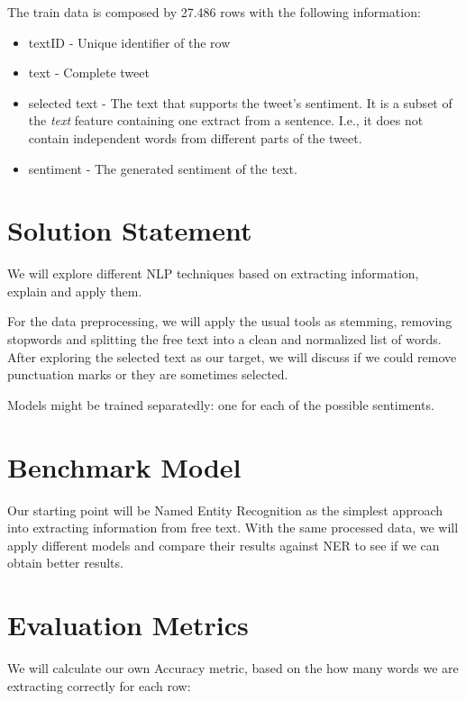 \documentclass[11pt]{article}
\begin{document}
The train data is composed by 27.486 rows with the following information:
\begin{itemize}
    \item textID - Unique identifier of the row
    \item text - Complete tweet
    \item selected text - The text that supports the tweet's sentiment. It is a subset of the \textit{text} feature containing one extract from a sentence. I.e., it does not contain independent words from different parts of the tweet.
    \item sentiment - The generated sentiment of the text.
\end{itemize}

\section{Solution Statement}

We will explore different NLP techniques based on extracting information, explain and apply them.

For the data preprocessing, we will apply the usual tools as stemming, removing stopwords and splitting the free text into a clean and normalized list of words. After exploring the selected text as our target, we will discuss if we could remove punctuation marks or they are sometimes selected.

Models might be trained separatedly: one for each of the possible sentiments.

\section{Benchmark Model}

Our starting point will be Named Entity Recognition as the simplest approach into extracting information from free text.
With the same processed data, we will apply different models and compare their results against NER to see if we can obtain better results.



\section{Evaluation Metrics}

We will calculate our own Accuracy metric, based on the how many words we are extracting correctly for each row:
\end{document}
